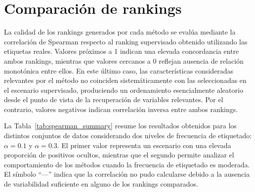 \section{Comparación de rankings}
\label{sec:comparacion_rankings}

La calidad de los rankings generados por cada método se evalúa mediante la correlación de Spearman respecto al ranking supervisado obtenido utilizando las etiquetas reales. Valores próximos a 1 indican una elevada concordancia entre ambos rankings, mientras que valores cercanos a 0 reflejan ausencia de relación monotónica entre ellos. En este último caso, las características consideradas relevantes por el método no coinciden sistemáticamente con las seleccionadas en el escenario supervisado, produciendo un ordenamiento esencialmente aleatorio desde el punto de vista de la recuperación de variables relevantes. Por el contrario, valores negativos indican correlación inversa entre ambos rankings.

La Tabla~\ref{tab:spearman_summary} resume los resultados obtenidos para los distintos conjuntos de datos considerando dos niveles de frecuencia de etiquetado: $\alpha=0.1$ y $\alpha=0.3$. El primer valor representa un escenario con una elevada proporción de positivos ocultos, mientras que el segundo permite analizar el comportamiento de los métodos cuando la frecuencia de etiquetado es moderada. El símbolo ``---'' indica que la correlación no pudo calcularse debido a la ausencia de variabilidad suficiente en alguno de los rankings comparados.

